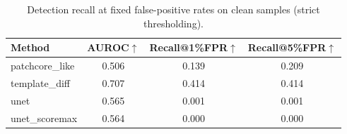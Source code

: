 \begin{table}[t]
\centering
\small
\begin{tabular}{lccc}
\toprule
Method & AUROC$\uparrow$ & Recall@1\%FPR$\uparrow$ & Recall@5\%FPR$\uparrow$ \\
\midrule
patchcore\_like & 0.506 & 0.139 & 0.209 \\
template\_diff & 0.707 & 0.414 & 0.414 \\
unet & 0.565 & 0.001 & 0.001 \\
unet\_scoremax & 0.564 & 0.000 & 0.000 \\
\bottomrule
\end{tabular}
\caption{Detection recall at fixed false-positive rates on clean samples (strict thresholding).}
\label{tab:detection_fpr}
\end{table}
